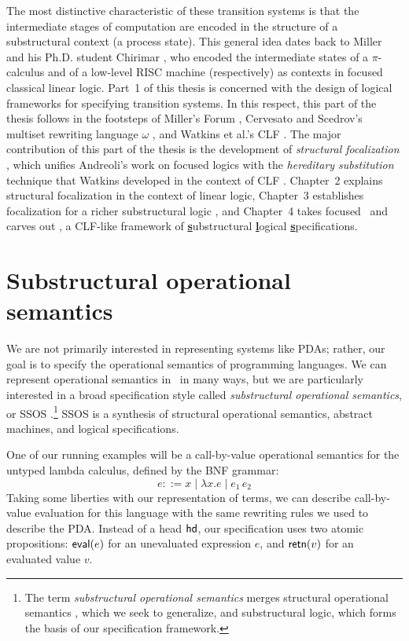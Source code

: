 The most distinctive characteristic of these transition systems is
that the intermediate stages of computation are encoded in the
structure of a substructural context (a process state). This general
idea dates back to Miller \cite{miller92pi} and his Ph.D. student
Chirimar \cite{chirimar95proof}, who encoded the intermediate states
of a $\pi$-calculus and of a low-level RISC machine (respectively) as
contexts in focused classical linear logic.  Part~1 of this thesis is
concerned with the design of logical frameworks for specifying
transition systems.  In this respect, this part of the thesis follows
in the footsteps of Miller's Forum \cite{miller96forum}, Cervesato and
Scedrov's multiset rewriting language $\omega$
\cite{cervesato09relating}, and Watkins et al.'s CLF
\cite{watkins02concurrent}. The major contribution of this part of the
thesis is the development of {\it structural focalization}
\cite{simmons11structural}, which unifies Andreoli's work on focused
logics \cite{andreoli92logic} with the {\it hereditary substitution}
technique that Watkins developed in the context of CLF
\cite{watkins02concurrent}. Chapter~2 explains structural focalization
in the context of linear logic, Chapter~3 establishes focalization for
a richer substructural logic \ollll, and Chapter~4 takes focused
\ollll~and carves out \sls, a CLF-like framework of \underline{\bf
  s}ubstructural \underline{\bf l}ogical \underline{\bf
  s}pecifications.

\section{Substructural operational semantics}
\label{sec:intro-ssos}

We are not primarily interested in representing systems like PDAs;
rather, our goal is to specify the operational semantics of
programming languages. We can represent operational semantics in
\sls~in many ways, but we are particularly interested in a broad
specification style called {\it substructural operational semantics},
or SSOS
\cite{pfenning04substructural,pfenning09substructural}.\footnote{The
  term {\it substructural operational semantics} merges structural
  operational semantics \cite{plotkin04structural}, which we seek to
  generalize, and substructural logic, which forms the basis of our
  specification framework.} SSOS is a synthesis of structural
operational semantics, abstract machines, and logical specifications.

One of our running
examples will be a call-by-value operational semantics for the untyped
lambda calculus, defined by the BNF grammar:
\[
e ::= x \mid \lambda x.e \mid e_1\,e_2
\]
Taking some liberties with our representation of terms, we can
describe call-by-value evaluation for this language with the same
rewriting rules we used to describe the PDA. Instead of a head ${\sf
  hd}$, our specification uses two atomic propositions: ${\sf
  eval}(e)$ for an unevaluated expression $e$, and ${\sf retn}(v)$
for an evaluated value $v$.


